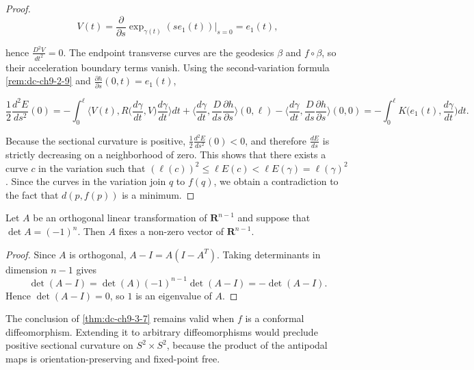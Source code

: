 \begin{proof}
  $$
  V(t)=\frac{\partial}{\partial s}\exp_{\gamma(t)}(se_1(t))\Big|_{s=0}=e_1(t),
  $$

  hence $\frac{D^2 V}{dt^2}=0$. The endpoint transverse curves are the
  geodesics $\beta$ and $f\circ\beta$, so their acceleration boundary terms vanish.
  Using the second-variation formula \cref{rem:dc-ch9-2-9} and
  $\frac{\partial h}{\partial s}(0,t)=e_1(t)$,

  $$
  \frac{1}{2}\frac{d^2 E}{ds^2}(0)=-\int_0^\ell\Big\langle V(t),R\Big(\frac{d\gamma}{dt},V\Big)\frac{d\gamma}{dt}\Big\rangle dt+\Big\langle\frac{d\gamma}{dt},\frac{D}{ds}\frac{\partial h}{\partial s}\Big\rangle(0,\ell)-\Big\langle\frac{d\gamma}{dt},\frac{D}{ds}\frac{\partial h}{\partial s}\Big\rangle(0,0)=-\int_0^\ell K\Big(e_1(t),\frac{d\gamma}{dt}\Big)dt.
  $$

  Because the sectional curvature is positive, $\frac{1}{2}\frac{d^2 E}{ds^2}(0)<0$,
  and therefore $\frac{dE}{ds}$ is strictly decreasing on a neighborhood of zero.
  This shows that there exists a curve $c$ in the variation such that
  $(\ell(c))^2\le\ell E(c)<\ell E(\gamma)=\ell(\gamma)^2$. Since the curves in the
  variation join $q$ to $f(q)$, we obtain a contradiction to the fact that
  $d(p,f(p))$ is a minimum.
\end{proof}
\begin{lemma}
  \label{lem:dc-ch9-3-8}


  Let $A$ be an orthogonal linear transformation of $\mathbf{R}^{n-1}$ and suppose
  that $\det A=(-1)^n$. Then $A$ fixes a non-zero vector of
  $\mathbf{R}^{n-1}$.
\end{lemma}
\begin{proof}
  \sketch
  Since $A$ is orthogonal, $A-I=A(I-A^{T})$. Taking determinants in dimension
  $n-1$ gives
  $$
  \det(A-I)=\det(A)(-1)^{n-1}\det(A-I)=-\det(A-I).
  $$
  Hence $\det(A-I)=0$, so $1$ is an eigenvalue of $A$.
\end{proof}
\begin{remark}
  \label{rem:dc-ch9-3-9}
  The conclusion of \cref{thm:dc-ch9-3-7} remains valid when $f$ is a
  conformal diffeomorphism. Extending it to arbitrary diffeomorphisms would
  preclude positive sectional curvature on $S^2\times S^2$, because the
  product of the antipodal maps is orientation-preserving and fixed-point free.
\end{remark}
